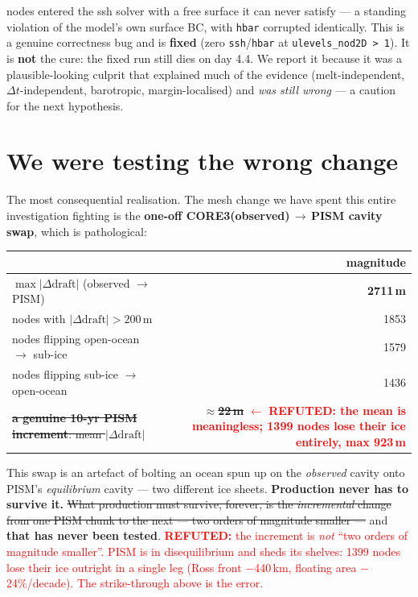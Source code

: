 \documentclass[11pt,a4paper]{article}
\newcommand{\code}[1]{\texttt{\small #1}}
\begin{document}
 nodes entered the ssh solver with a free surface it can never satisfy --- a standing
violation of the model's own surface BC, with \code{hbar} corrupted identically. This is a
genuine correctness bug and is \textbf{fixed} (zero \code{ssh}/\code{hbar} at
\code{ulevels\_nod2D > 1}). It is \textbf{not} the cure: the fixed run still dies on day 4.4.
We report it because it was a plausible-looking culprit that explained much of the evidence
(melt-independent, $\Delta t$-independent, barotropic, margin-localised) and \emph{was still
wrong} --- a caution for the next hypothesis.

\section{We were testing the wrong change}\label{sec:wrongchange}

The most consequential realisation. The mesh change we have spent this entire investigation
fighting is the \textbf{one-off CORE3(observed)$\,\to\,$PISM cavity swap}, which is
pathological:

\begin{center}
\begin{tabular}{@{}lr@{}}
\toprule
& magnitude \\
\midrule
$\max |\Delta \mathrm{draft}|$ (observed $\to$ PISM) & \textbf{2711\,m} \\
nodes with $|\Delta \mathrm{draft}| > 200$\,m & 1853 \\
nodes flipping open-ocean $\to$ sub-ice & 1579 \\
nodes flipping sub-ice $\to$ open-ocean & 1436 \\
\midrule
\sout{\textbf{a genuine 10-yr PISM increment}: mean $|\Delta \mathrm{draft}|$} & \sout{\textbf{$\approx$22\,m}} \textcolor{red}{$\leftarrow$ \textbf{REFUTED: the mean is meaningless; 1399 nodes lose their ice entirely, max 923\,m}} \\
\bottomrule
\end{tabular}
\end{center}

\noindent
This swap is an artefact of bolting an ocean spun up on the \emph{observed} cavity onto PISM's
\emph{equilibrium} cavity --- two different ice sheets. \textbf{Production never has to survive
it.} \sout{What production must survive, forever, is the \emph{incremental} change from one PISM
chunk to the next --- two orders of magnitude smaller ---} and \textbf{that has never been
tested}.
\textcolor{red}{\textbf{REFUTED:} the increment is \emph{not} ``two orders of magnitude smaller''.
PISM is in disequilibrium and sheds its shelves: 1399 nodes lose their ice outright in a single leg
(Ross front $-$440\,km, floating area $-$24\%/decade). The strike-through above is the error.}
\end{document}
